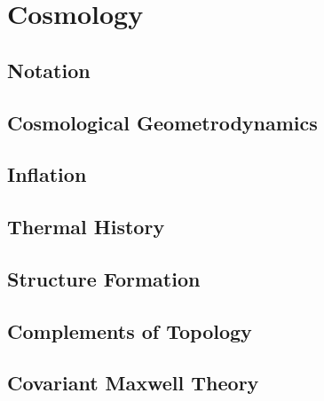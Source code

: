 \documentclass[a4paper, 12pt]{book}
\begin{document}
\part{Cosmology}
\pagestyle{body}

\pagestyle{notation}
\chapter*{Notation}


\pagestyle{body}
\chapter{Cosmological Geometrodynamics}


\chapter{Inflation}


\chapter{Thermal History}


\chapter{Structure Formation}


\begin{appendices}
\pagestyle{append}

\chapter{Complements of Topology}


\clearpage
\chapter{Covariant Maxwell Theory}


\end{appendices}

\clearpage
{}
\pagestyle{biblio}
\printbibliography[heading = bibintoc, title = {Bibliography}]
\end{document}
